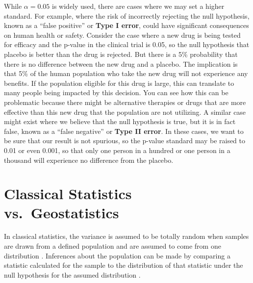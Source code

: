 \documentclass[
]{book}
\begin{document}
While \(α=0.05\) is widely used, there are cases where we may set a higher standard. For example, where the risk of incorrectly rejecting the null hypothesis, known as a ``false positive'' or \textbf{Type I error}, could have significant consequences on human health or safety. Consider the case where a new drug is being tested for efficacy and the p-value in the clinical trial is 0.05, so the null hypothesis that placebo is better than the drug is rejected. But there is a 5\% probability that there is no difference between the new drug and a placebo. The implication is that 5\% of the human population who take the new drug will not experience any benefits. If the population eligible for this drug is large, this can translate to many people being impacted by this decision. You can see how this can be problematic because there might be alternative therapies or drugs that are more effective than this new drug that the population are not utilizing. A similar case might exist where we believe that the null hypothesis is true, but it is in fact false, known as a ``false negative'' or \textbf{Type II error}. In these cases, we want to be sure that our result is not spurious, so the p-value standard may be raised to 0.01 or even 0.001, so that only one person in a hundred or one person in a thousand will experience no difference from the placebo.

\hypertarget{classical-statistics-vs.-geostatistics}{%
\section{Classical Statistics vs.~Geostatistics}\label{classical-statistics-vs.-geostatistics}}

In classical statistics, the variance is assumed to be totally random when samples are drawn from a defined population \citep{jacquez_spatial_1999} and are assumed to come from one distribution \citep{steel_principles_1980}. Inferences about the population can be made by comparing a statistic calculated for the sample to the distribution of that statistic under the null hypothesis for the assumed distribution \citep{jacquez_spatial_1999}.
\end{document}
